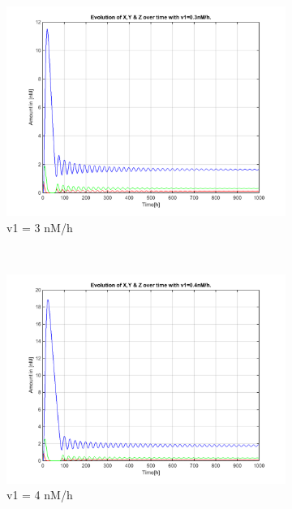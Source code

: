\documentclass[10pt,a4paper,oneside,twocolumn]{article}
\numberwithin{equation}{section} %
\begin{document}
\begin{figure}
	\begin{subfigure}[b]{0.32\textwidth}
	    \includegraphics[width=\textwidth]{LotsofthesameA/A-A3.png}
	    \caption{v1 = 3 nM/h}
	\end{subfigure}
	~ 
	\begin{subfigure}[b]{0.32\textwidth}
	    \includegraphics[width=\textwidth]{LotsofthesameA/A-A4.png}
	    \caption{v1 = 4 nM/h}
	\end{subfigure}
	~
	\begin{subfigure}[b]{0.32\textwidth}

\end{subfigure}
\end{figure}
\end{document}
